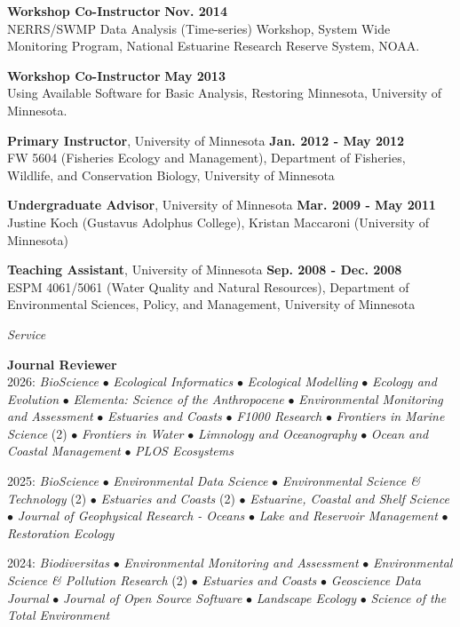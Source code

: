 \documentclass[letterpaper,12pt]{article}
\newcommand{\sectitle}[1]{\vspace{\baselineskip} \centerline{\large{\textit{#1}}}}
\begin{document}
{\bf Workshop Co-Instructor} \hfill {\bf Nov. 2014}\\
NERRS/SWMP Data Analysis (Time-series) Workshop, System Wide Monitoring Program, National Estuarine Research Reserve System, NOAA.

{\bf Workshop Co-Instructor} \hfill {\bf May 2013} \\
Using Available Software for Basic Analysis, Restoring Minnesota, University of Minnesota.

{\bf Primary Instructor}, University of Minnesota \hfill {\bf Jan. 2012 - May 2012} \\
FW 5604 (Fisheries Ecology and Management), Department of Fisheries, Wildlife, and Conservation Biology, University of Minnesota

{\bf Undergraduate Advisor}, University of Minnesota \hfill {\bf Mar. 2009 - May 2011} \\
Justine Koch (Gustavus Adolphus College), Kristan Maccaroni (University of Minnesota)

{\bf Teaching Assistant}, University of Minnesota \hfill {\bf Sep. 2008 - Dec. 2008} \\
ESPM 4061/5061 (Water Quality and Natural Resources), Department of Environmental Sciences, Policy, and Management, University of Minnesota

\sectitle{Service}

{\bf Journal Reviewer}\hfill \\

2026: \textit{BioScience} $\bullet$ \textit{Ecological Informatics} $\bullet$ \textit{Ecological Modelling} $\bullet$ \textit{Ecology and Evolution} $\bullet$ \textit{Elementa: Science of the Anthropocene} $\bullet$ \textit{Environmental Monitoring and Assessment} $\bullet$ \textit{Estuaries and Coasts} $\bullet$ \textit{F1000 Research} $\bullet$ \textit{Frontiers in Marine Science} (2) $\bullet$ \textit{Frontiers in Water} $\bullet$ \textit{Limnology and Oceanography} $\bullet$ \textit{Ocean and Coastal Management} $\bullet$ \textit{PLOS Ecosystems}

2025: \textit{BioScience} $\bullet$ \textit{Environmental Data Science} $\bullet$ \textit{Environmental Science \& Technology} (2) $\bullet$ \textit{Estuaries and Coasts} (2) $\bullet$ \textit{Estuarine, Coastal and Shelf Science} $\bullet$ \textit{Journal of Geophysical Research - Oceans} $\bullet$ \textit{Lake and Reservoir Management} $\bullet$ \textit{Restoration Ecology}

2024: \textit{Biodiversitas} $\bullet$ \textit{Environmental Monitoring and Assessment} $\bullet$ \textit{Environmental Science \& Pollution Research} (2) $\bullet$ \textit{Estuaries and Coasts} $\bullet$ \textit{Geoscience Data Journal} $\bullet$ \textit{Journal of Open Source Software} $\bullet$ \textit{Landscape Ecology} $\bullet$ \textit{Science of the Total Environment}
\end{document}
